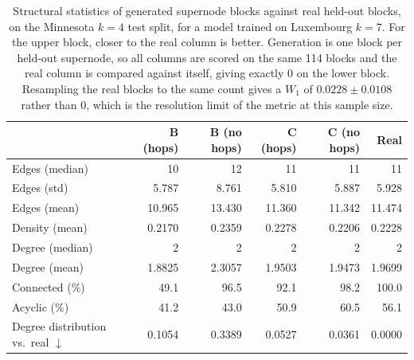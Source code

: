 \begin{table}[H]
\centering
\caption{Structural statistics of generated supernode blocks against real
held-out blocks, on the Minnesota $k{=}4$ test split, for a model trained on
Luxembourg $k{=}7$. For the upper block, closer to the real column is
better. Generation is one block per held-out supernode, so all columns are
scored on the same 114 blocks and the real column is compared against
itself, giving exactly $0$ on the lower block. Resampling the real blocks to
the same count gives a $W_1$ of $0.0228 \pm 0.0108$ rather
than $0$, which is the resolution limit of the metric at this sample size.}
\label{tab:dintra-lux2minn-k7k4-stats}
\begin{tabular}{lrrrrr}
\toprule
 & B (hops) & B (no hops) & C (hops) & C (no hops) & Real \\
\midrule
Edges (median)                     & 10 & 12 & 11 & 11 & 11 \\
Edges (std)                        & 5.787 & 8.761 & 5.810 & 5.887 & 5.928 \\
Edges (mean)                       & 10.965 & 13.430 & 11.360 & 11.342 & 11.474 \\
Density (mean)                     & 0.2170 & 0.2359 & 0.2278 & 0.2206 & 0.2228 \\
Degree (median)                    & 2 & 2 & 2 & 2 & 2 \\
Degree (mean)                      & 1.8825 & 2.3057 & 1.9503 & 1.9473 & 1.9699 \\
Connected (\%)                     & 49.1 & 96.5 & 92.1 & 98.2 & 100.0 \\
Acyclic (\%)                       & 41.2 & 43.0 & 50.9 & 60.5 & 56.1 \\
\midrule
Degree distribution vs.\ real $\downarrow$ & 0.1054 & 0.3389 & 0.0527 & 0.0361 & 0.0000 \\
\bottomrule
\end{tabular}
\end{table}

